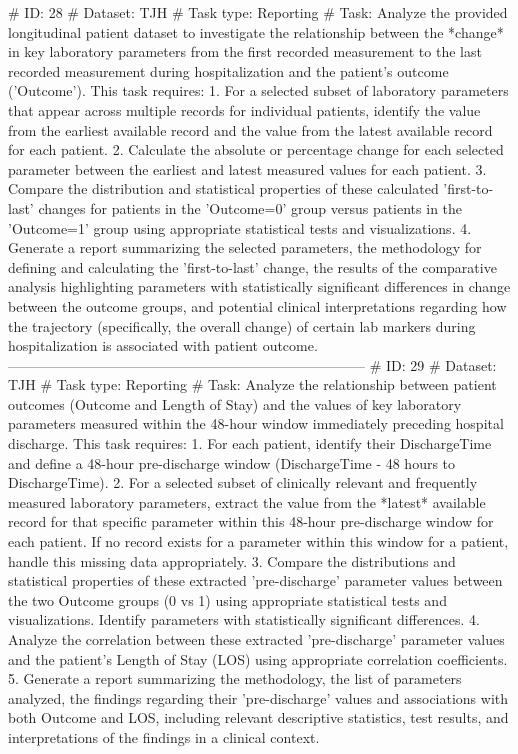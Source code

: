 \begin{tcolorbox}[colback=cadmiumgreen!5!white,colframe=forestgreen!75!white,breakable,title=\textit{Generated analytical tasks in task 4.}]
\begin{VerbatimWrap}
# ID: 28  
# Dataset: TJH 
# Task type: Reporting
# Task: Analyze the provided longitudinal patient dataset to investigate the relationship between the *change* in key laboratory parameters from the first recorded measurement to the last recorded measurement during hospitalization and the patient's outcome ('Outcome'). This task requires: 1. For a selected subset of laboratory parameters that appear across multiple records for individual patients, identify the value from the earliest available record and the value from the latest available record for each patient. 2. Calculate the absolute or percentage change for each selected parameter between the earliest and latest measured values for each patient. 3. Compare the distribution and statistical properties of these calculated 'first-to-last' changes for patients in the 'Outcome=0' group versus patients in the 'Outcome=1' group using appropriate statistical tests and visualizations. 4. Generate a report summarizing the selected parameters, the methodology for defining and calculating the 'first-to-last' change, the results of the comparative analysis highlighting parameters with statistically significant differences in change between the outcome groups, and potential clinical interpretations regarding how the trajectory (specifically, the overall change) of certain lab markers during hospitalization is associated with patient outcome.
-----------------------------------------------------------------------------
# ID: 29  
# Dataset: TJH 
# Task type: Reporting
# Task: Analyze the relationship between patient outcomes (Outcome and Length of Stay) and the values of key laboratory parameters measured within the 48-hour window immediately preceding hospital discharge. This task requires: 1. For each patient, identify their DischargeTime and define a 48-hour pre-discharge window (DischargeTime - 48 hours to DischargeTime). 2. For a selected subset of clinically relevant and frequently measured laboratory parameters, extract the value from the *latest* available record for that specific parameter within this 48-hour pre-discharge window for each patient. If no record exists for a parameter within this window for a patient, handle this missing data appropriately. 3. Compare the distributions and statistical properties of these extracted 'pre-discharge' parameter values between the two Outcome groups (0 vs 1) using appropriate statistical tests and visualizations. Identify parameters with statistically significant differences. 4. Analyze the correlation between these extracted 'pre-discharge' parameter values and the patient's Length of Stay (LOS) using appropriate correlation coefficients. 5. Generate a report summarizing the methodology, the list of parameters analyzed, the findings regarding their 'pre-discharge' values and associations with both Outcome and LOS, including relevant descriptive statistics, test results, and interpretations of the findings in a clinical context.

\end{VerbatimWrap}
\end{tcolorbox}
